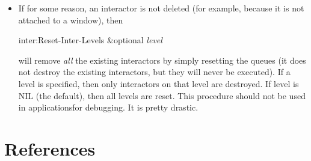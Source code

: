 \begin{itemize}
\item 
If for some reason, an interactor is not
deleted (for example, because it is not attached to a window), then
\begin{programexample}
inter:Reset-Inter-Levels \&optional {\it level}\value{function}
\end{programexample}
will remove {\it all} the existing interactors by simply resetting the queues (it
does not destroy the existing interactors, but they will never be
executed).  If a level is specified, then only interactors on that level
are destroyed.  If level is NIL (the default), then all levels are reset.
This procedure should not be used in applications\dashonly for debugging.
It is pretty drastic.

\end{itemize}

% 
% 
% 
% 
% 
% 
% 
\chapter*{References}

